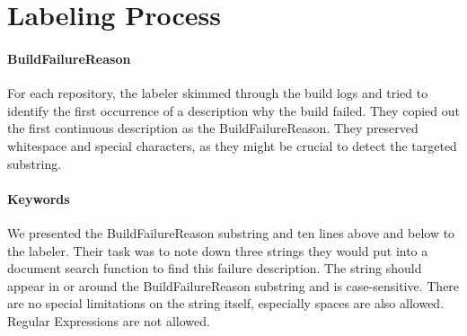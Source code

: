 \documentclass[\myrootdir/main.tex]{subfiles}
\begin{document}



\section{Labeling Process}

\paragraph{BuildFailureReason}
For each repository, the labeler skimmed through the build logs and tried to identify the first occurrence of a description why the build failed.
They copied out the first continuous description as the BuildFailureReason.
They preserved whitespace and special characters, as they might be crucial to detect the targeted substring.

\paragraph{Keywords}
We presented the BuildFailureReason substring and ten lines above and below to the labeler.
Their task was to note down three strings they would put into a document search function to find this failure description.
The string should appear in or around the BuildFailureReason substring and is case-sensitive.
There are no special limitations on the string itself, especially spaces are also allowed.
Regular Expressions are not allowed.
\end{document}
